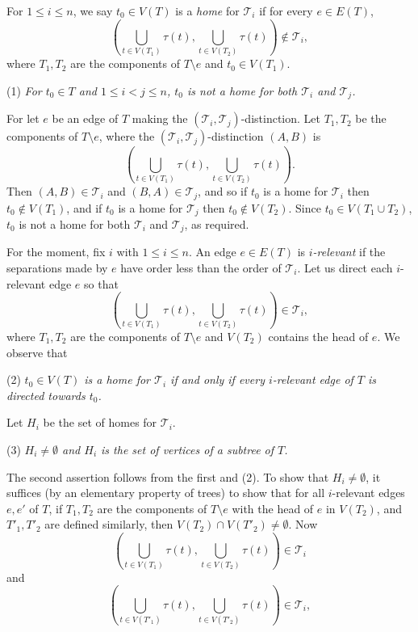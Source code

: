 For $1 \le i \le n$, we say $t_0 \in V(T)$ is a \textit{home} for $\mathscr{T}_i$ if for every $e \in E(T)$,
\begin{equation*}
\left( \bigcup_{t \in V(T_1)} \tau(t), \bigcup_{t \in V(T_2)} \tau(t) \right) \notin \mathscr{T}_i,
\end{equation*}
where $T_1, T_2$ are the components of $T \setminus e$ and $t_0 \in V(T_1)$.

\hspace*{12pt}(1) \textit{For $t_0 \in T$ and $1 \le i < j \le n$, $t_0$ is not a home for both $\mathscr{T}_i$ and $\mathscr{T}_j$.}

For let $e$ be an edge of $T$ making the $(\mathscr{T}_i, \mathscr{T}_j)$-distinction. Let $T_1, T_2$ be the components of $T \setminus e$, where the $(\mathscr{T}_i, \mathscr{T}_j)$-distinction $(A, B)$ is
\begin{equation*}
\left( \bigcup_{t \in V(T_1)} \tau(t), \bigcup_{t \in V(T_2)} \tau(t) \right).
\end{equation*}
Then $(A, B) \in \mathscr{T}_i$ and $(B, A) \in \mathscr{T}_j$, and so if $t_0$ is a home for $\mathscr{T}_i$ then $t_0 \notin V(T_1)$, and if $t_0$ is a home for $\mathscr{T}_j$ then $t_0 \notin V(T_2)$. Since $t_0 \in V(T_1 \cup T_2)$, $t_0$ is not a home for both $\mathscr{T}_i$ and $\mathscr{T}_j$, as required.

For the moment, fix $i$ with $1 \le i \le n$. An edge $e \in E(T)$ is \textit{$i$-relevant} if the separations made by $e$ have order less than the order of $\mathscr{T}_i$. Let us direct each $i$-relevant edge $e$ so that
\begin{equation*}
\left( \bigcup_{t \in V(T_1)} \tau(t), \bigcup_{t \in V(T_2)} \tau(t) \right) \in \mathscr{T}_i,
\end{equation*}
where $T_1, T_2$ are the components of $T \setminus e$ and $V(T_2)$ contains the head of $e$. We observe that

\hspace*{12pt}(2) \textit{$t_0 \in V(T)$ is a home for $\mathscr{T}_i$ if and only if every $i$-relevant edge of $T$ is directed towards $t_0$.}

Let $H_i$ be the set of homes for $\mathscr{T}_i$.

\hspace*{12pt}(3) \textit{$H_i \ne \emptyset$ and $H_i$ is the set of vertices of a subtree of $T$.}

The second assertion follows from the first and (2). To show that $H_i \ne \emptyset$, it suffices (by an elementary property of trees) to show that for all $i$-relevant edges $e, e'$ of $T$, if $T_1, T_2$ are the components of $T \setminus e$ with the head of $e$ in $V(T_2)$, and $T'_1, T'_2$ are defined similarly, then $V(T_2) \cap V(T'_2) \ne \emptyset$. Now
\begin{equation*}
\left( \bigcup_{t \in V(T_1)} \tau(t), \bigcup_{t \in V(T_2)} \tau(t) \right) \in \mathscr{T}_i
\end{equation*}
and
\begin{equation*}
\left( \bigcup_{t \in V(T'_1)} \tau(t), \bigcup_{t \in V(T'_2)} \tau(t) \right) \in \mathscr{T}_i,
\end{equation*}
